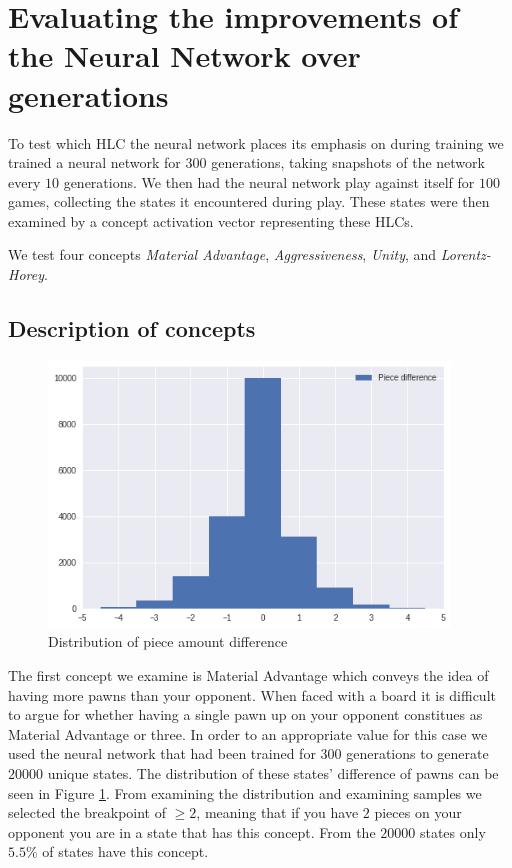 \section{Evaluating the improvements of the Neural Network over generations}

To test which HLC the neural network places its emphasis on during training we trained a neural network for $300$ generations, taking snapshots of the network every $10$ generations. We then had the neural network play against itself for $100$ games, collecting the states it encountered during play. These states were then examined by a concept activation vector representing these HLCs.

We test four concepts \textit{Material Advantage}, \textit{Aggressiveness}, \textit{Unity}, and \textit{Lorentz-Horey}.

\subsection{Description of concepts}

\begin{figure}
    \begin{small}
        \begin{center}
            \includegraphics[width=0.95\textwidth]{graphics/dist_number_adv}
        \end{center}
    \end{small}
    \caption{Distribution of piece amount difference}
    \label{fig:distnumberadv}
\end{figure}

The first concept we examine is Material Advantage which conveys the idea of having more pawns than your opponent. When faced with a board it is difficult to argue for whether having a single pawn up on your opponent constitues as Material Advantage or three. In order to an appropriate value for this case we used the neural network that had been trained for $300$ generations to generate $20000$ unique states. The distribution of these states' difference of pawns can be seen in Figure \ref{fig:distnumberadv}. From examining the distribution and examining samples we selected the breakpoint of $\geq 2$, meaning that if you have $2$ pieces on your opponent you are in a state that has this concept. From the $20000$ states only $5.5\%$ of states have this concept.

